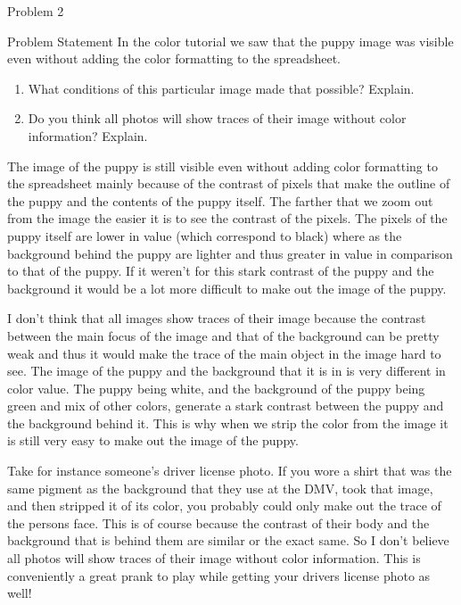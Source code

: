 \begin{problem}{Problem 2}
    \begin{statement}{Problem Statement}
        In the color tutorial we saw that the puppy image was visible even without adding the color formatting to the spreadsheet.

        \begin{enumerate}[label = (\alph*)]
            \item What conditions of this particular image made that possible? Explain.
            \item Do you think all photos will show traces of their image without color information? Explain.
        \end{enumerate}
    \end{statement}

    \begin{highlight}
        The image of the puppy is still visible even without adding color formatting to the spreadsheet mainly because of the contrast of pixels that make the outline of the puppy and the contents of 
        the puppy itself. The farther that we zoom out from the image the easier it is to see the contrast of the pixels. The pixels of the puppy itself are lower in value (which correspond to black)
        where as the background behind the puppy are lighter and thus greater in value in comparison to that of the puppy. If it weren't for this stark contrast of the puppy and the background it would
        be a lot more difficult to make out the image of the puppy.
    \end{highlight}

    \begin{highlight}
        I don't think that all images show traces of their image because the contrast between the main focus of the image and that of the background can be pretty weak and thus it would make the trace
        of the main object in the image hard to see. The image of the puppy and the background that it is in is very different in color value. The puppy being white, and the background of the puppy being
        green and mix of other colors, generate a stark contrast between the puppy and the background behind it. This is why when we strip the color from the image it is still very easy to make out the
        image of the puppy.

        Take for instance someone's driver license photo. If you wore a shirt that was the same pigment as the background that they use at the DMV, took that image, and then stripped it of its color,
        you probably could only make out the trace of the persons face. This is of course because the contrast of their body and the background that is behind them are similar or the exact same. So I
        don't believe all photos will show traces of their image without color information. This is conveniently a great prank to play while getting your drivers license photo as well!
    \end{highlight}
\end{problem}

